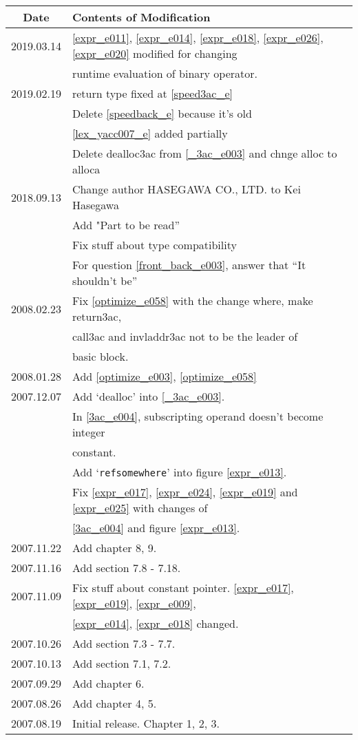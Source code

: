 \begin{tabular}{|c|l|} \hline
  Date &  Contents of Modification \\ \hline
  2019.03.14 & \ref{expr_e011}, \ref{expr_e014}, \ref{expr_e018}, \ref{expr_e026}, \ref{expr_e020} modified for changing \\
  & runtime evaluation of binary operator. \\ \hline
2019.02.19 & return type fixed at \ref{speed3ac_e} \\
           & Delete \ref{speedback_e} because it's old \\
& \ref{lex_yacc007_e} added partially \\
 & Delete dealloc3ac from \ref{_3ac_e003} and chnge alloc to alloca \\ \hline
2018.09.13 & Change author HASEGAWA CO., LTD. to Kei Hasegawa \\
           & Add "Part to be read'' \\
& Fix stuff about type compatibility \\
& For question \ref{front_back_e003}, answer that ``It shouldn't be'' \\
\hline
2008.02.23 & Fix \ref{optimize_e058} with the change where, make
           return3ac, \\
           & call3ac  and invladdr3ac not to be the leader of \\
           & basic block. \\ \hline
2008.01.28 & Add \ref{optimize_e003}, \ref{optimize_e058} \\ \hline
2007.12.07 & Add `dealloc' into \ref{_3ac_e003}. \\
           & In \ref{3ac_e004}, subscripting operand doesn't become integer \\
           & constant. \\
           & Add `{\tt{refsomewhere}}' into figure \ref{expr_e013}. \\
           & Fix \ref{expr_e017}, \ref{expr_e024}, \ref{expr_e019}
             and \ref{expr_e025} with changes of \\
           &  \ref{3ac_e004} and figure \ref{expr_e013}. \\ \hline
2007.11.22 & Add chapter 8, 9. \\ \hline
2007.11.16 & Add section 7.8 - 7.18. \\ \hline
2007.11.09 & Fix stuff about constant pointer. \ref{expr_e017},
             \ref{expr_e019}, \ref{expr_e009}, \\
           & \ref{expr_e014}, \ref{expr_e018} changed. \\ \hline
2007.10.26 & Add section 7.3 - 7.7. \\ \hline
2007.10.13 & Add section 7.1, 7.2. \\ \hline
2007.09.29 & Add chapter 6. \\ \hline
2007.08.26 & Add chapter 4, 5. \\ \hline
2007.08.19 & Initial release. Chapter 1, 2, 3. \\ \hline
\end{tabular}
